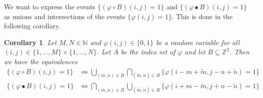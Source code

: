 \documentclass[a4paper,12pt]{article}
\theoremstyle{plain}
\newtheorem{corollary}[theorem]{Corollary}
\theoremstyle{definition}
\theoremstyle{remark}
\begin{document}
We want to express the events $\{ (\varphi \circ B)(i, j) = 1 \}$ and $\{ (\varphi \bullet B)(i, j) = 1 \}$ as unions and intersections of the events $\{ \varphi(i, j) = 1 \}$. This is done in the following corollary.

\begin{corollary}
	Let $M, N \in \mathbb{N}$ and $\varphi(i, j) \in \{ 0, 1 \}$ be a random variable for all $(i, j) \in \{ 1, \dots, M \} \times \{ 1, \dots, N \}$. Let $A$ be the index set of $\varphi$ and let $B \subseteq \mathbb{Z}^2$. Then we have the equivalences
	\begin{align}
		\{ (\varphi \circ B)(i, j) = 1 \} &\Leftrightarrow \bigcup_{(m, n) \in B} \bigcap_{(\tilde{m}, \tilde{n}) \in B} \{ \varphi(i - m + \tilde{m}, j - n + \tilde{n}) = 1 \} \label{eqeventopening} \\
		\{ (\varphi \bullet B)(i, j) = 1 \} &\Leftrightarrow \bigcap_{(m, n) \in B} \bigcup_{(\tilde{m}, \tilde{n}) \in B} \{ \varphi(i + m - \tilde{m}, j + n - \tilde{n}) = 1 \} \label{eqeventclosing}
	\end{align}
\end{corollary}
\end{document}
